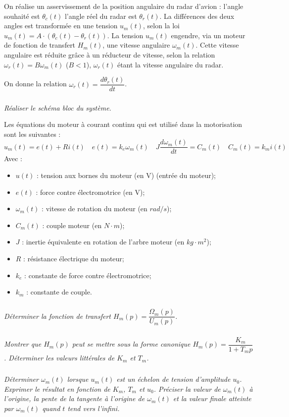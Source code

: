 \documentclass[10pt]{article}
\begin{document}
On réalise un asservissement de la position angulaire du radar d'avion : l'angle souhaité est $\theta_c(t)$ l'angle réel du radar est $\theta_r(t)$. La différences des deux angles est transformée en une tension $u_m(t)$, selon la loi $u_m(t)=A\cdot\left( \theta_c(t) -\theta_r(t) \right)$. La tension $u_m(t)$ engendre, via un moteur de fonction de transfert $H_m(t)$, une  vitesse angulaire $\omega_m(t)$. Cette vitesse angulaire est réduite grâce à un réducteur de vitesse, selon la relation $\omega_r(t)=B\omega_m(t)$ ($B<1$), $\omega_r(t)$ étant la vitesse angulaire du radar.

 On donne la relation $\omega_r(t)= \dfrac{d\theta_r(t)}{dt}$.
 
 
 \subparagraph{}
 \textit{Réaliser le schéma bloc du système.}
 
 Les équations du moteur à courant continu qui est utilisé dans la motorisation sont les suivantes :
 $$
 u_m(t)=e(t)+Ri(t) 
 \quad e(t)=k_e\omega_m(t) 
 \quad J\dfrac{d\omega_m(t)}{dt}=C_m(t)
 \quad C_m(t)=k_mi(t)
 $$
 Avec : 
 
 \begin{itemize}
 \item $u(t)$ : tension aux bornes du moteur (en V) (entrée du moteur);
 \item $e(t)$ : force contre électromotrice (en V);
 \item $\omega_m(t)$ : vitesse de rotation du moteur (en $rad/s$);
 \item $C_m(t)$ : couple moteur (en $N\cdot m$);
 \item $J$ : inertie équivalente en rotation de l'arbre moteur (en $kg\cdot m^2$);
 \item $R$ : résistance électrique du moteur;
 \item $k_e$ : constante de force contre électromotrice;
 \item $k_m$ : constante de couple.
 \end{itemize}
 
 \subparagraph{}
 \textit{Déterminer la fonction de transfert $H_m(p)=\dfrac{\Omega_m(p)}{U_m(p)}$.}
 
 \subparagraph{}
 \textit{Montrer que $H_m(p)$ peut se mettre sous la forme canonique $H_m(p)=\dfrac{K_m}{1+T_m p}$. Déterminer les valeurs littérales de $K_m$ et $T_m$.}
 
 
 \subparagraph{}
 \textit{Déterminer $\omega_m(t)$ lorsque $u_m(t)$ est un échelon de tension d'amplitude $u_0$. Exprimer le résultat en fonction de $K_m$, $T_m$ et $u_0$. Préciser la valeur de $\omega_m(t)$ à l'origine, la pente de la tangente à l'origine de $\omega_m(t)$ et la valeur finale atteinte par $\omega_m(t)$ quand $t$ tend vers l'infini.}
 
\end{document}
